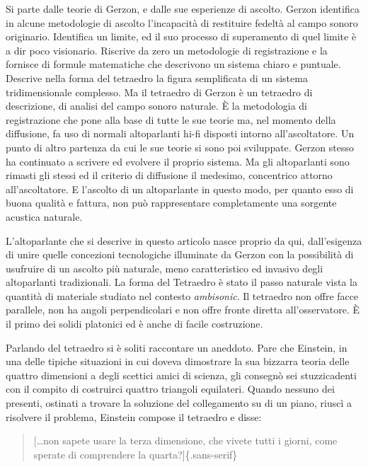 \documentclass[a4paper,11pt]{article}
\begin{document}
Si parte dalle teorie di Gerzon, e dalle sue esperienze di ascolto.
Gerzon identifica in alcune metodologie di ascolto l'incapacità di
restituire fedeltà al campo sonoro originario. Identifica un limite, ed
il suo processo di superamento di quel limite è a dir poco visionario.
Riscrive da zero un metodologie di registrazione e la fornisce di
formule matematiche che descrivono un sistema chiaro e puntuale.
Descrive nella forma del tetraedro la figura semplificata di un sistema
tridimensionale complesso. Ma il tetraedro di Gerzon è un tetraedro di
descrizione, di analisi del campo sonoro naturale. È la metodologia di
registrazione che pone alla base di tutte le sue teorie ma, nel momento
della diffusione, fa uso di normali altoparlanti hi-fi disposti intorno
all'ascoltatore. Un punto di altro partenza da cui le sue teorie si sono
poi sviluppate. Gerzon stesso ha continuato a scrivere ed evolvere il
proprio sistema. Ma gli altoparlanti sono rimasti gli stessi ed il
criterio di diffusione il medesimo, concentrico attorno all'ascoltatore.
E l'ascolto di un altoparlante in questo modo, per quanto esso di buona
qualità e fattura, non può rappresentare completamente una sorgente
acustica naturale.

L'altoparlante che si descrive in questo articolo nasce proprio da qui,
dall'esigenza di unire quelle concezioni tecnologiche illuminate da
Gerzon con la possibilità di usufruire di un ascolto più naturale, meno
caratteristico ed invasivo degli altoparlanti tradizionali. La forma del
Tetraedro è stato il passo naturale vista la quantità di materiale
studiato nel contesto \emph{ambisonic}. Il tetraedro non offre facce
parallele, non ha angoli perpendicolari e non offre fronte diretta
all'osservatore. È il primo dei solidi platonici ed è anche di facile
costruzione.

Parlando del tetraedro si è soliti raccontare un aneddoto. Pare che
Einstein, in una delle tipiche situazioni in cui doveva dimostrare la
sua bizzarra teoria delle quattro dimensioni a degli scettici amici di
scienza, gli consegnò sei stuzzicadenti con il compito di costruirci
quattro triangoli equilateri. Quando nessuno dei presenti, ostinati a
trovare la soluzione del collegamento su di un piano, riuscì a risolvere
il problema, Einstein compose il tetraedro e disse:

\begin{quote}
{[}\ldots{}non sapete usare la terza dimensione, che vivete tutti i giorni,
come sperate di comprendere la quarta?{]}\{.sans-serif\}
\end{quote}
\end{document}
